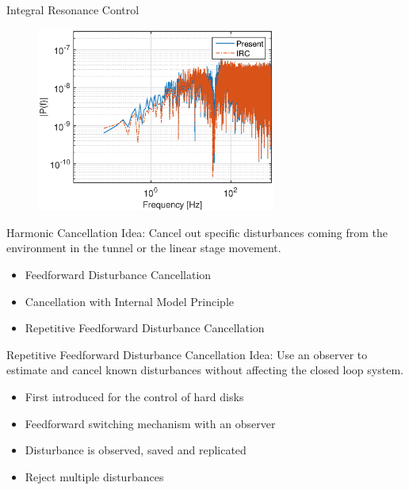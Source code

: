 \documentclass[10pt]{beamer}
\begin{document}
\begin{frame}{Integral Resonance Control}
  \begin{figure}[h!]
    \centering
    \includegraphics[width=0.7\textwidth]{../fig/matlab/whitenoiseoutput.eps}
  \end{figure}
\end{frame}

\begin{frame}{Harmonic Cancellation}
  \alert{Idea}: Cancel out specific disturbances coming from the environment in the tunnel or the linear stage movement.
  \begin{itemize}
    \item Feedforward Disturbance Cancellation
    \item Cancellation with Internal Model Principle
    \item Repetitive Feedforward Disturbance Cancellation
  \end{itemize}
\end{frame}

\begin{frame}{Repetitive Feedforward Disturbance Cancellation}
  \alert{Idea}: Use an observer to estimate and cancel known disturbances without affecting the closed loop system.
  \begin{itemize}
    \item First introduced for the control of hard disks
    \item Feedforward switching mechanism with an observer
    \item Disturbance is observed, saved and replicated
    \item Reject multiple disturbances
  \end{itemize}
\end{frame}
\end{document}
